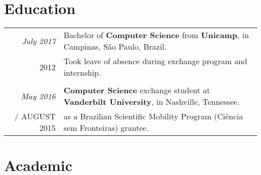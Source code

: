 \documentclass[a4paper,10pt]{article}
\makeatletter
\def\fakesc#1{%
  \begingroup%
  \xdef\fake@name{\csname\curr@fontshape/\f@size\endcsname}%
  \fontsize{\fontdimen8\fake@name}{\baselineskip}\selectfont%
  \uppercase{#1}%
  \endgroup%
}
\renewcommand{\textsc}{\fakesc}
\makeatother
\begin{document}
\section{Education}

\begin{tabularx}{\textwidth}{r|X}

  \emph{July 2017} & Bachelor of \textbf{Computer Science} from \textbf{Unicamp}, in Campinas, São Paulo, Brazil.\\
  \textsc{2012} & {\footnotesize Took leave of absence during exchange program and internship.}  \\

  \multicolumn{2}{c}{}\\

  \emph{May 2016} & \textbf{Computer Science} exchange student at \textbf{Vanderbilt University}, in Nashville, Tennessee. \\
  \textsc{August 2015} & {\footnotesize as a Brazilian Scientific Mobility Program (Ciência sem Fronteiras) grantee.}  \\

\end{tabularx}

\section{Academic}
\end{document}
